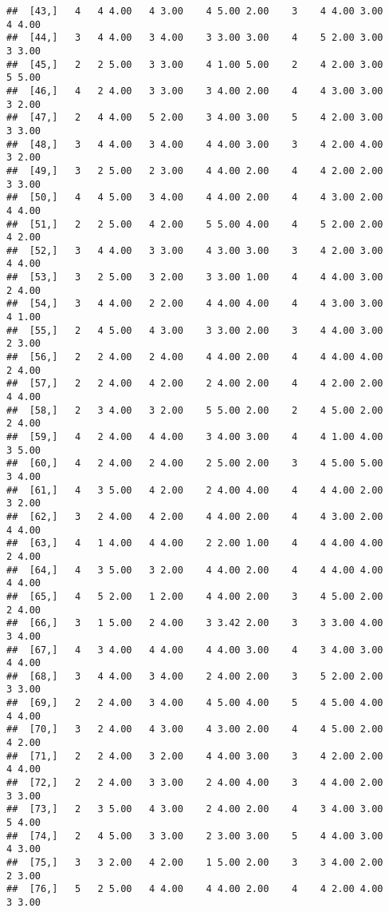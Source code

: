 \documentclass[]{article}
\begin{document}
\begin{verbatim}
##  [43,]   4   4 4.00   4 3.00    4 5.00 2.00    3    4 4.00 3.00    4 4.00
##  [44,]   3   4 4.00   3 4.00    3 3.00 3.00    4    5 2.00 3.00    3 3.00
##  [45,]   2   2 5.00   3 3.00    4 1.00 5.00    2    4 2.00 3.00    5 5.00
##  [46,]   4   2 4.00   3 3.00    3 4.00 2.00    4    4 3.00 3.00    3 2.00
##  [47,]   2   4 4.00   5 2.00    3 4.00 3.00    5    4 2.00 3.00    3 3.00
##  [48,]   3   4 4.00   3 4.00    4 4.00 3.00    3    4 2.00 4.00    3 2.00
##  [49,]   3   2 5.00   2 3.00    4 4.00 2.00    4    4 2.00 2.00    3 3.00
##  [50,]   4   4 5.00   3 4.00    4 4.00 2.00    4    4 3.00 2.00    4 4.00
##  [51,]   2   2 5.00   4 2.00    5 5.00 4.00    4    5 2.00 2.00    4 2.00
##  [52,]   3   4 4.00   3 3.00    4 3.00 3.00    3    4 2.00 3.00    4 4.00
##  [53,]   3   2 5.00   3 2.00    3 3.00 1.00    4    4 4.00 3.00    2 4.00
##  [54,]   3   4 4.00   2 2.00    4 4.00 4.00    4    4 3.00 3.00    4 1.00
##  [55,]   2   4 5.00   4 3.00    3 3.00 2.00    3    4 4.00 3.00    2 3.00
##  [56,]   2   2 4.00   2 4.00    4 4.00 2.00    4    4 4.00 4.00    2 4.00
##  [57,]   2   2 4.00   4 2.00    2 4.00 2.00    4    4 2.00 2.00    4 4.00
##  [58,]   2   3 4.00   3 2.00    5 5.00 2.00    2    4 5.00 2.00    2 4.00
##  [59,]   4   2 4.00   4 4.00    3 4.00 3.00    4    4 1.00 4.00    3 5.00
##  [60,]   4   2 4.00   2 4.00    2 5.00 2.00    3    4 5.00 5.00    3 4.00
##  [61,]   4   3 5.00   4 2.00    2 4.00 4.00    4    4 4.00 2.00    3 2.00
##  [62,]   3   2 4.00   4 2.00    4 4.00 2.00    4    4 3.00 2.00    4 4.00
##  [63,]   4   1 4.00   4 4.00    2 2.00 1.00    4    4 4.00 4.00    2 4.00
##  [64,]   4   3 5.00   3 2.00    4 4.00 2.00    4    4 4.00 4.00    4 4.00
##  [65,]   4   5 2.00   1 2.00    4 4.00 2.00    3    4 5.00 2.00    2 4.00
##  [66,]   3   1 5.00   2 4.00    3 3.42 2.00    3    3 3.00 4.00    3 4.00
##  [67,]   4   3 4.00   4 4.00    4 4.00 3.00    4    3 4.00 3.00    4 4.00
##  [68,]   3   4 4.00   3 4.00    2 4.00 2.00    3    5 2.00 2.00    3 3.00
##  [69,]   2   2 4.00   3 4.00    4 5.00 4.00    5    4 5.00 4.00    4 4.00
##  [70,]   3   2 4.00   4 3.00    4 3.00 2.00    4    4 5.00 2.00    4 2.00
##  [71,]   2   2 4.00   3 2.00    4 4.00 3.00    3    4 2.00 2.00    4 4.00
##  [72,]   2   2 4.00   3 3.00    2 4.00 4.00    3    4 4.00 2.00    3 3.00
##  [73,]   2   3 5.00   4 3.00    2 4.00 2.00    4    3 4.00 3.00    5 4.00
##  [74,]   2   4 5.00   3 3.00    2 3.00 3.00    5    4 4.00 3.00    4 3.00
##  [75,]   3   3 2.00   4 2.00    1 5.00 2.00    3    3 4.00 2.00    2 3.00
##  [76,]   5   2 5.00   4 4.00    4 4.00 2.00    4    4 2.00 4.00    3 3.00

\end{verbatim}
\end{document}
